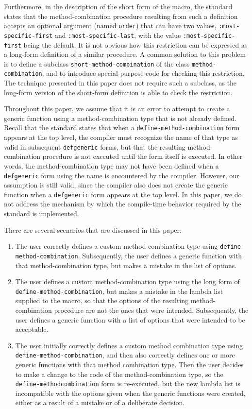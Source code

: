 Furthermore, in the description of the short form of the macro, the
standard states that the method-combination procedure resulting from
such a definition accepts an optional argument (named \texttt{order})
that can have two values, \texttt{:most-specific-first} and
\texttt{:most-specific-last}, with the value
\texttt{:most-specific-first} being the default.  It is not obvious
how this restriction can be expressed as a long-form definition of a
similar procedure.  A common solution to this problem is to define a
subclass \texttt{short-method-combination} of the class
\texttt{method-combination}, and to introduce special-purpose code for
checking this restriction.  The technique presented in this paper does
not require such a subclass, as the long-form version of the
short-form definition is able to check the restriction.

Throughout this paper, we assume that it is an error to attempt to
create a generic function using a method-combination type that is not
already defined.  Recall that the standard states that when a
\texttt{define-method-combination} form appears at the top level, the
compiler must recognize the name of that type as valid in subsequent
\texttt{defgeneric} forms, but that the resulting method-combination
procedure is not executed until the form itself is executed.  In other
words, the method-combination type may not have been defined when a
\texttt{defgeneric} form using the name is encountered by the
compiler.  However, our assumption is still valid, since the compiler
also does not create the generic function when a \texttt{defgeneric}
form appears at the top level.  In this paper, we do not address the
mechanism by which the compile-time behavior required by the standard
is implemented.

There are several scenarios that are discussed in this paper:

\begin{enumerate}
\item The user correctly defines a custom method-combination type
  using \texttt{define-method-combination}.  Subsequently, the user
  defines a generic function with that method-combination type, but
  makes a mistake in the list of options.
\item The user defines a custom method-combination type using the long
  form of \texttt{define-method-combination}, but makes a mistake in
  the lambda list supplied to the macro, so that the options of the
  resulting method-combination procedure are not the ones that were
  intended.  Subsequently, the user defines a generic function with a
  list of options that were intended to be acceptable.
\item The user initially correctly defines a custom method combination
  type using \texttt{define-method-combination}, and then also
  correctly defines one or more generic functions with that method
  combination type.  Then the user decides to make a change to the
  code of the method-combination type, so the
  \texttt{define-method\-combination} form is re-executed, but the new
  lambda list is incompatible with the options given when the generic
  functions were created, either as a result of a mistake or of a
  deliberate decision.
\end{enumerate}

